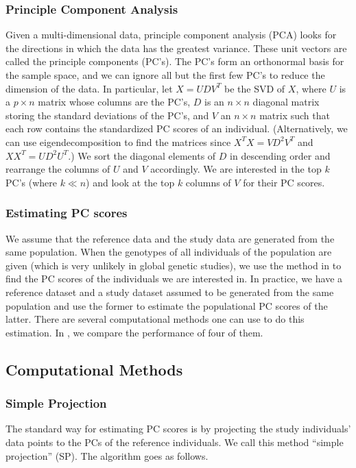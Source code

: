 \documentclass{article}
\begin{document}
\subsubsection{Principle Component Analysis}\label{pca-intro}
  Given a multi-dimensional data, principle component analysis (PCA) looks for the directions in which the data has the greatest variance.
These unit vectors are called the principle components (PC's).
The PC's form an orthonormal basis for the sample space,
and we can ignore all but the first few PC's to reduce the dimension of the data.
In particular, let $X=UDV^T$ be the SVD of $X$,
where $U$ is a $p \times n$ matrix whose columns are the PC's,
$D$ is an $n \times n$ diagonal matrix storing the standard deviations of the PC's,
and $V$ an $n \times n$ matrix such that each row contains the standardized PC scores of an individual.
(Alternatively, we can use eigendecomposition to find the matrices since $X^T X = VD^2V^T$ and $X X^T = UD^2U^T$.)
We sort the diagonal elements of $D$ in descending order and rearrange the
columns of $U$ and $V$ accordingly.
We are interested in the top $k$ PC's (where $k \ll n$) and look at the top $k$
columns of $V$ for their PC scores.

\subsubsection{Estimating PC scores}

We assume that the reference data and the study data are generated from the same
population.
When the genotypes of all individuals of the population are given (which is very
unlikely in global genetic studies),
we use the method in  to find the PC scores of the individuals
we are interested in.
In practice, we have a reference dataset and a study dataset assumed to be generated from the
same population and use the former to estimate the populational PC scores of the latter.
There are several computational methods one can use to do this estimation.
In , we compare the performance of four of them.

\subsection{Computational Methods}\label{sec:compu}



\subsubsection{Simple Projection}
The standard way for estimating PC scores is by projecting the study
individuals' data points to the PCs of the reference individuals.
We call this method ``simple projection'' (SP).
The algorithm goes as follows.
\end{document}
